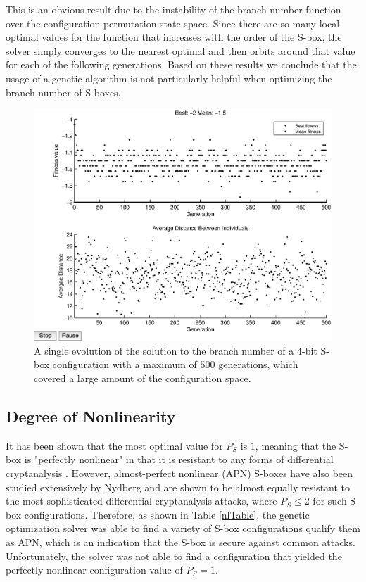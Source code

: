 \documentclass[11pt]{article}
\begin{document}
This is an obvious result due to the instability of the branch number function over the configuration permutation state space. Since there are so many local optimal values for the function that increases with the order of the S-box, the solver simply converges to the nearest optimal and then orbits around that value for each of the following generations. Based on these results we conclude that the usage of a genetic algorithm is not particularly helpful when optimizing the branch number of S-boxes.

\begin{figure}[!ht]
	\centering
	\includegraphics[scale=0.5]{images/bn_results16.eps} 

\caption{A single evolution of the solution to the branch number of a $4$-bit S-box configuration with a maximum of $500$ generations, which covered a large amount of the configuration space.}
	\label{bn16}
\end{figure}

\subsection{Degree of Nonlinearity}
It has been shown that the most optimal value for $P_S$ is $1$, meaning that the S-box is "perfectly nonlinear" in that it is resistant to any forms of differential cryptanalysis \cite{ProvableSecurity}. However, almost-perfect nonlinear (APN) S-boxes have also been studied extensively by Nydberg and are shown to be almost equally resistant to the most sophisticated differential cryptanalysis attacks, where $P_S \leq 2$ for such S-box configurations. Therefore, as shown in Table \ref{nlTable}, the genetic optimization solver was able to find a variety of S-box configurations qualify them as APN, which is an indication that the S-box is secure against common attacks. Unfortunately, the solver was not able to find a configuration that yielded the perfectly nonlinear configuration value of $P_S = 1$. 
\end{document}
